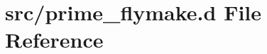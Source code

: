 \hypertarget{prime__flymake_8d}{\section{src/prime\-\_\-flymake.d \-File \-Reference}
\label{dc/dd3/prime__flymake_8d}
}
